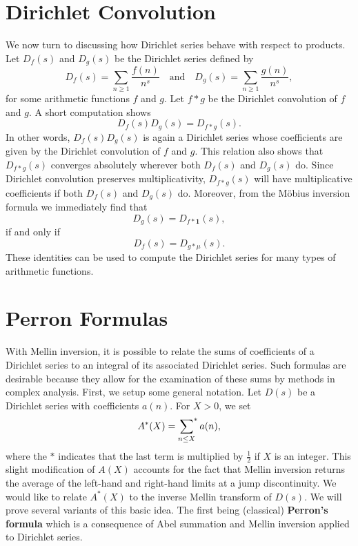   \section{Dirichlet Convolution}
    We now turn to discussing how Dirichlet series behave with respect to products. Let \(D_{f}(s)\) and \(D_{g}(s)\) be the Dirichlet series defined by
    \[
      D_{f}(s) = \sum_{n \ge 1}\frac{f(n)}{n^{s}} \quad \text{and} \quad D_{g}(s) = \sum_{n \ge 1}\frac{g(n)}{n^{s}},
    \]
    for some arithmetic functions \(f\) and \(g\). Let \(f \ast g\) be the Dirichlet convolution of \(f\) and \(g\). A short computation shows
    \[
      D_{f}(s)D_{g}(s) = D_{f \ast g}(s).
    \]
    In other words, \(D_{f}(s)D_{g}(s)\) is again a Dirichlet series whose coefficients are given by the Dirichlet convolution of \(f\) and \(g\). This relation also shows that \(D_{f \ast g}(s)\) converges absolutely wherever both \(D_{f}(s)\) and \(D_{g}(s)\) do. Since Dirichlet convolution preserves multiplicativity, \(D_{f \ast g}(s)\) will have multiplicative coefficients if both \(D_{f}(s)\) and \(D_{g}(s)\) do. Moreover, from the M\"obius inversion formula we immediately find that
    \[
      D_{g}(s) = D_{f \ast \mathbf{1}}(s),
    \]
    if and only if
    \[
      D_{f}(s) = D_{g \ast \mu}(s).
    \]
    These identities can be used to compute the Dirichlet series for many types of arithmetic functions.
  \section{Perron Formulas}
    With Mellin inversion, it is possible to relate the sums of coefficients of a Dirichlet series to an integral of its associated Dirichlet series. Such formulas are desirable because they allow for the examination of these sums by methods in complex analysis. First, we setup some general notation. Let \(D(s)\) be a Dirichlet series with coefficients \(a(n)\). For \(X > 0\), we set
    \[
      A^{\ast}(X) = \sideset{}{^{\ast}}\sum_{n \le X}a(n),
    \]
    where the \(\ast\) indicates that the last term is multiplied by \(\frac{1}{2}\) if \(X\) is an integer. This slight modification of \(A(X)\) accounts for the fact that Mellin inversion returns the average of the left-hand and right-hand limits at a jump discontinuity. We would like to relate \(A^{\ast}(X)\) to the inverse Mellin transform of \(D(s)\). We will prove several variants of this basic idea. The first being (classical) \textbf{Perron's formula} which is a consequence of Abel summation and Mellin inversion applied to Dirichlet series.

